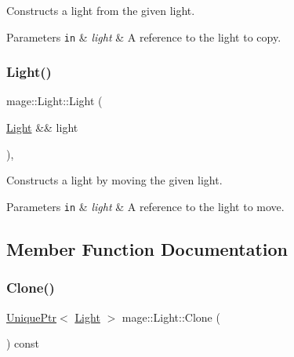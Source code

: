 Constructs a light from the given light.


\begin{DoxyParams}[1]{Parameters}
\mbox{\tt in}  & {\em light} & A reference to the light to copy. \\
\hline
\end{DoxyParams}
\hypertarget{classmage_1_1_light_a75343c11264fa27c4f166caaf0fec880}{}\label{classmage_1_1_light_a75343c11264fa27c4f166caaf0fec880} 
\subsubsection{\texorpdfstring{Light()}{Light()}\hspace{0.1cm}{\footnotesize\ttfamily [3/3]}}
{\footnotesize\ttfamily mage\+::\+Light\+::\+Light (\begin{DoxyParamCaption}\item[{\hyperlink{classmage_1_1_light}{Light} \&\&}]{light }\end{DoxyParamCaption})\hspace{0.3cm}{\ttfamily [protected]}, {\ttfamily [default]}}

Constructs a light by moving the given light.


\begin{DoxyParams}[1]{Parameters}
\mbox{\tt in}  & {\em light} & A reference to the light to move. \\
\hline
\end{DoxyParams}


\subsection{Member Function Documentation}
\hypertarget{classmage_1_1_light_a4c87e4a361b20519c49b4a0397625a6a}{}\label{classmage_1_1_light_a4c87e4a361b20519c49b4a0397625a6a} 
\subsubsection{\texorpdfstring{Clone()}{Clone()}}
{\footnotesize\ttfamily \hyperlink{namespacemage_a3316d7143a973e37adf1110f2e80ca31}{Unique\+Ptr}$<$ \hyperlink{classmage_1_1_light}{Light} $>$ mage\+::\+Light\+::\+Clone (\begin{DoxyParamCaption}{ }\end{DoxyParamCaption}) const}

